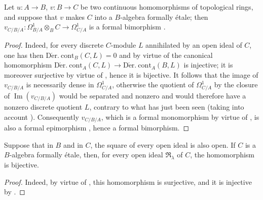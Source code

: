 \begin{proposition}[20.7.6]
\label{0.20.7.6}
Let $u:A\to B$, $v:B\to C$ be two continuous homomorphisms of topological rings, and suppose that $v$ makes $C$ into a $B$-algebra formally \'{e}tale; then $v_{C/B/A}:\Omega^1_{B/A}\otimes_B C\to\Omega^1_{C/A}$ is a formal bimorphism .
\end{proposition}

\begin{proof}
Indeed, for every discrete $C$-module $L$ annihilated by an open ideal of $C$, one has then  $\operatorname{D\acute{e}r.\ cont}_B(C,L)=0$ and by virtue of  the canonical homomorphism
$\operatorname{D\acute{e}r.\ cont}_A(C,L)\to\operatorname{D\acute{e}r.\ cont}_A(B,L)$ is injective; it is moreover surjective by virtue of , hence it is bijective. It follows that the image of $v_{C/B/A}$ is necessarily dense in $\Omega^1_{C/A}$, otherwise the quotient of $\Omega^1_{C/A}$ by the closure of $\operatorname{Im}(v_{C/B/A})$ would be separated and nonzero and would therefore have a nonzero discrete quotient $L$, contrary to what has just been seen (taking into account ). Consequently $v_{C/B/A}$, which is a formal monomorphism by virtue of , is also a formal epimorphism , hence a formal bimorphism.
\end{proof}

\begin{corollary}[20.7.7]
\label{0.20.7.7}
Suppose that in $B$ and in $C$, the square of every open ideal is also open.
If $C$ is a $B$-algebra formally \'{e}tale, then, for every open ideal $\mathfrak{R}_\lambda$ of $C$, the homomorphism  is bijective.
\end{corollary}

\begin{proof}
Indeed, by virtue of , this homomorphism is surjective, and it is injective by .
\end{proof}

